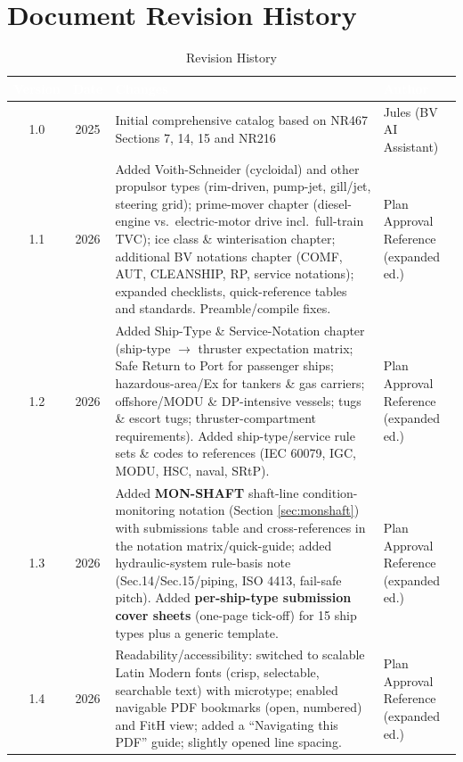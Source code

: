 \documentclass[11pt,a4paper]{report}
\begin{document}
\section{Document Revision History}

\begin{table}[H]
\centering
\caption{Revision History}
\begin{tabular}{|c|c|p{6cm}|p{3cm}|}
\hline
\rowcolor{bvblue}
\textcolor{white}{\textbf{Version}} & \textcolor{white}{\textbf{Date}} & \textcolor{white}{\textbf{Changes}} & \textcolor{white}{\textbf{Author}} \\
\hline
1.0 & 2025 & Initial comprehensive catalog based on NR467 Sections 7, 14, 15 and NR216 & Jules (BV AI Assistant) \\
\hline
1.1 & 2026 & Added Voith-Schneider (cycloidal) and other propulsor types (rim-driven, pump-jet, gill/jet, steering grid); prime-mover chapter (diesel-engine vs.\ electric-motor drive incl.\ full-train TVC); ice class \& winterisation chapter; additional BV notations chapter (COMF, AUT, CLEANSHIP, RP, service notations); expanded checklists, quick-reference tables and standards. Preamble/compile fixes. & Plan Approval Reference (expanded ed.) \\
\hline
1.2 & 2026 & Added Ship-Type \& Service-Notation chapter (ship-type $\rightarrow$ thruster expectation matrix; Safe Return to Port for passenger ships; hazardous-area/Ex for tankers \& gas carriers; offshore/MODU \& DP-intensive vessels; tugs \& escort tugs; thruster-compartment requirements). Added ship-type/service rule sets \& codes to references (IEC 60079, IGC, MODU, HSC, naval, SRtP). & Plan Approval Reference (expanded ed.) \\
\hline
1.3 & 2026 & Added \textbf{MON-SHAFT} shaft-line condition-monitoring notation (Section \ref{sec:monshaft}) with submissions table and cross-references in the notation matrix/quick-guide; added hydraulic-system rule-basis note (Sec.14/Sec.15/piping, ISO 4413, fail-safe pitch). Added \textbf{per-ship-type submission cover sheets} (one-page tick-off) for 15 ship types plus a generic template. & Plan Approval Reference (expanded ed.) \\
\hline
1.4 & 2026 & Readability/accessibility: switched to scalable Latin Modern fonts (crisp, selectable, searchable text) with microtype; enabled navigable PDF bookmarks (open, numbered) and FitH view; added a ``Navigating this PDF'' guide; slightly opened line spacing. & Plan Approval Reference (expanded ed.) \\

\end{tabular}
\end{table}
\end{document}
